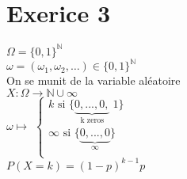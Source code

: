 \documentclass{article}
\author{Frederic Becerril}
\newcommand{\hbrace}[2]{\underset{#1}{\underbrace{#2}}}
\begin{document}
\part*{Exerice 3}

$\Omega = \{0, 1\}^{\mathbb{N}}$\\
$\omega = (\omega_1, \omega_2, \dots) \in \{0, 1\}^{\mathbb{N}}$\\
On se munit de la variable aléatoire\\
$X: \Omega \rightarrow \mathbb{N} \cup \infty$\\
$\omega \mapsto $
$\left\{
    \begin{array}{ll}
        k \mbox{ si } \{\hbrace{\mbox{ k zeros }}{0, ..., 0,} \; 1\}\\
        \infty \mbox{ si }\{\hbrace{\infty}{0, ..., 0}\}\\
    \end{array}
\right.$\\
$P(X = k) = (1 - p)^{k - 1}p$\\
\end{document}

